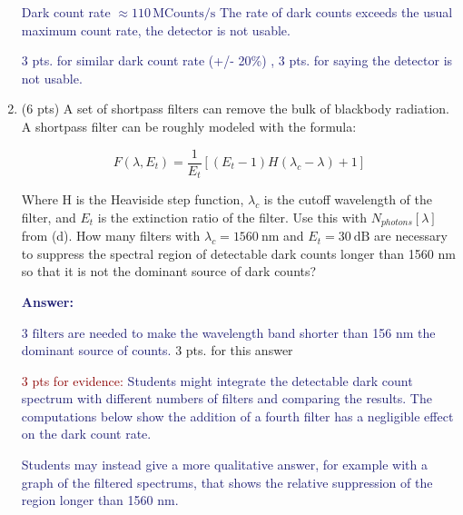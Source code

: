 \documentclass[11pt]{caltech_thesis} %
\begin{document}
\begin{enumerate}
  \textcolor{midnightblue}{Dark count rate
  \(\approx \boxed{110 \,\text{MCounts/s}}\) }
  \textcolor{midnightblue}{The rate of dark counts exceeds the usual
  maximum count rate, the detector is not usable. }

  \textcolor{midnightblue}{3 pts. for similar dark count rate (+/- 20\%)
  , 3 pts. for saying the detector is not usable.}
\item
  (6 pts) A set of shortpass filters can remove the bulk of blackbody
  radiation. A shortpass filter can be roughly modeled with the formula:

  \[F(\lambda, E_t) = \frac{1}{E_t}[(E_t - 1)H(\lambda_c - \lambda) + 1]\]

  Where H is the Heaviside step function, \(\lambda_c\) is the cutoff
  wavelength of the filter, and \(E_t\) is the extinction ratio of the
  filter. Use this with \(N_{photons}[\lambda]\) from (d). How many
  filters with \(\lambda_c = 1560~\text{nm}\) and \(E_t = 30~\text{dB}\)
  are necessary to suppress the spectral region of detectable dark
  counts longer than 1560 nm so that it is not the dominant source of
  dark counts?

  \textcolor{midnightblue}{ \textbf{Answer:} }

  \textcolor{midnightblue}{\(\boxed{\text{3 filters}}\) are needed to
  make the wavelength band shorter than 156 nm the dominant source of
  counts.} {3 pts. for this answer}

  \textcolor{darkred}{3 pts for evidence:}
  \textcolor{midnightblue}{Students might integrate the detectable dark
  count spectrum with different numbers of filters and comparing the
  results. The computations below show the addition of a fourth filter
  has a negligible effect on the dark count rate. }

  \textcolor{midnightblue}{Students may instead give a more qualitative
  answer, for example with a graph of the filtered spectrums, that shows
  the relative suppression of the region longer than 1560 nm. }


\end{enumerate}
\end{document}

